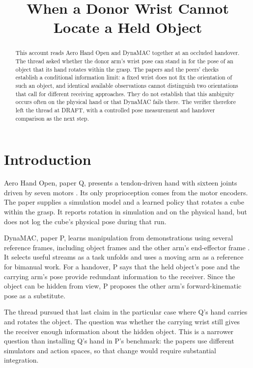 \documentclass{article}
\title{When a Donor Wrist Cannot Locate a Held Object}
\begin{document}
\maketitle

\begin{abstract}
This account reads Aero Hand Open and DynaMAC together at an occluded handover. The thread asked
whether the donor arm's wrist pose can stand in for the pose of an object that its hand rotates
within the grasp. The papers and the peers' checks establish a conditional information limit: a
fixed wrist does not fix the orientation of such an object, and identical available observations
cannot distinguish two orientations that call for different receiving approaches. They do not
establish that this ambiguity occurs often on the physical hand or that DynaMAC fails there. The
verifier therefore left the thread at DRAFT, with a controlled pose measurement and handover
comparison as the next step.
\end{abstract}

\section{Introduction}

Aero Hand Open, paper Q, presents a tendon-driven hand with sixteen joints driven by seven motors
\cite{q}. Its only proprioception comes from the motor encoders. The paper supplies a simulation
model and a learned policy that rotates a cube within the grasp. It reports rotation in simulation
and on the physical hand, but does not log the cube's physical pose during that run.

DynaMAC, paper P, learns manipulation from demonstrations using several reference frames, including
object frames and the other arm's end-effector frame \cite{p}. It selects useful streams as a task
unfolds and uses a moving arm as a reference for bimanual work. For a handover, P says that the held
object's pose and the carrying arm's pose provide redundant information to the receiver. Since the
object can be hidden from view, P proposes the other arm's forward-kinematic pose as a substitute.

The thread pursued that last claim in the particular case where Q's hand carries and rotates the
object. The question was whether the carrying wrist still gives the receiver enough information
about the hidden object. This is a narrower question than installing Q's hand in P's benchmark: the
papers use different simulators and action spaces, so that change would require substantial
integration.
\end{document}
